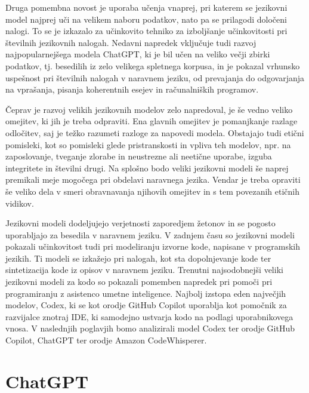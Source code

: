 \documentclass[12pt,a4paper]{book}
\begin{document}
Druga pomembna novost je uporaba učenja vnaprej, pri katerem se jezikovni model najprej uči na velikem naboru podatkov, nato pa se prilagodi določeni nalogi. To se je izkazalo za učinkovito tehniko za izboljšanje učinkovitosti pri številnih jezikovnih nalogah.
Nedavni napredek vključuje tudi razvoj najpopularnejšega modela ChatGPT, ki je bil učen na veliko večji zbirki podatkov, tj. besedilih iz zelo velikega spletnega korpusa, in je pokazal vrhunsko uspešnost pri številnih nalogah v naravnem jeziku, od prevajanja do odgovarjanja na vprašanja, pisanja koherentnih esejev in računalniških programov.
\cite{KASNECI2023102274}

Čeprav je razvoj velikih jezikovnih modelov zelo napredoval, je še vedno veliko omejitev, ki jih je treba odpraviti. Ena glavnih omejitev je pomanjkanje razlage odločitev, saj je težko razumeti razloge za napovedi modela. Obstajajo tudi etični pomisleki, kot so pomisleki glede pristranskosti in vpliva teh modelov, npr. na zaposlovanje, tveganje zlorabe in neustrezne ali neetične uporabe, izguba integritete in številni drugi. Na splošno bodo veliki jezikovni modeli še naprej premikali meje mogočega pri obdelavi naravnega jezika. Vendar je treba opraviti še veliko dela v smeri obravnavanja njihovih omejitev in s tem povezanih etičnih vidikov.

Jezikovni modeli dodeljujejo verjetnosti zaporedjem žetonov in se pogosto uporabljajo za besedila v naravnem jeziku. V zadnjem času so jezikovni modeli pokazali učinkovitost tudi pri modeliranju izvorne kode, napisane v programskih jezikih. Ti modeli se izkažejo pri nalogah, kot sta dopolnjevanje kode ter sintetizacija kode iz opisov v naravnem jeziku. 
Trenutni najsodobnejši veliki jezikovni modeli za kodo so pokazali pomemben napredek pri pomoči pri programiranju z asistenco umetne inteligence. Najbolj izstopa eden največjih modelov, Codex, ki se kot orodje GitHub Copilot uporablja kot pomočnik za razvijalce znotraj IDE, ki samodejno ustvarja kodo na podlagi uporabnikovega vnosa. V naslednjih poglavjih bomo analizirali model Codex ter orodje GitHub Copilot, ChatGPT ter orodje Amazon CodeWhisperer.

\cite{KASNECI2023102274}
\cite{vaswani2023attention}

\section{ChatGPT}
\end{document}
